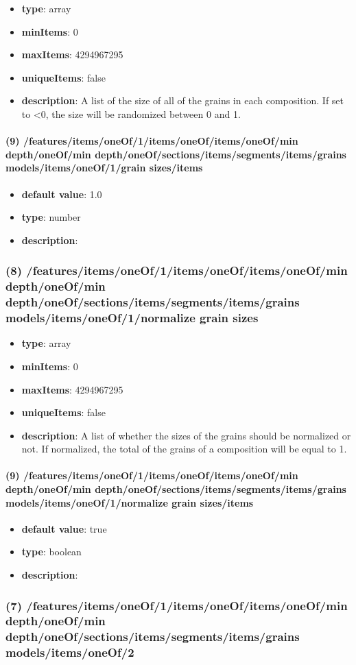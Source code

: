 \begin{itemize}[leftmargin=8em]\item {\bf type}: array
\item {\bf minItems}: 0
\item {\bf maxItems}: 4294967295
\item {\bf uniqueItems}: false
\item {\bf description}: A list of the size of all of the grains in each composition. If set to <0, the size will be randomized between 0 and 1.
\end{itemize}\paragraph{(9) /features/items/oneOf/1/items/oneOf/items/oneOf/min depth/oneOf/min depth/oneOf/sections/items/segments/items/grains models/items/oneOf/1/grain sizes/items}
\begin{itemize}[leftmargin=9em]\item {\bf default value}: 1.0
\item {\bf type}: number
\item {\bf description}: 
\end{itemize}\subsubsection{(8) /features/items/oneOf/1/items/oneOf/items/oneOf/min depth/oneOf/min depth/oneOf/sections/items/segments/items/grains models/items/oneOf/1/normalize grain sizes}
\begin{itemize}[leftmargin=8em]\item {\bf type}: array
\item {\bf minItems}: 0
\item {\bf maxItems}: 4294967295
\item {\bf uniqueItems}: false
\item {\bf description}: A list of whether the sizes of the grains should be normalized or not. If normalized, the total of the grains of a composition will be equal to 1.
\end{itemize}\paragraph{(9) /features/items/oneOf/1/items/oneOf/items/oneOf/min depth/oneOf/min depth/oneOf/sections/items/segments/items/grains models/items/oneOf/1/normalize grain sizes/items}
\begin{itemize}[leftmargin=9em]\item {\bf default value}: true
\item {\bf type}: boolean
\item {\bf description}: 
\end{itemize}\subsubsection{(7) /features/items/oneOf/1/items/oneOf/items/oneOf/min depth/oneOf/min depth/oneOf/sections/items/segments/items/grains models/items/oneOf/2}
